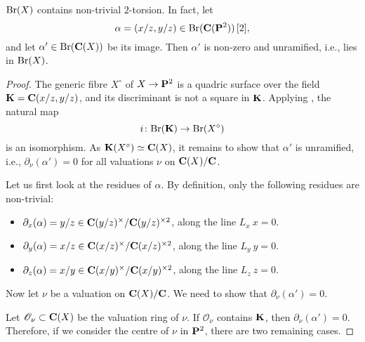 \begin{proposition}
    $\mathrm{Br} (X)$ contains non-trivial $2$-torsion. 
    In fact, let
    \[ \alpha = (x/z, y/z) \in \Br ( \bbC(\bbP^2) ) \, [2] , \]
    and let $\alpha' \in \Br (\bbC(X))$ be its image.
    Then $\alpha'$ is non-zero and unramified, i.e., lies in $\mathrm{Br} (X)$.
\end{proposition}

\begin{proof}
    The generic fibre $X^\circ$ of $X \to \bbP^2$ is a quadric surface over the field $\bbK = \bbC (x/z, y/z)$,
    and its discriminant is not a square in $\bbK$.
    Applying \cite[Proposition~6.2.3~(c)]{colliot-brauer}, the natural map 
    \[ i \: \Br (\bbK) \to \Br (X^\circ) \]
    is an isomorphism. As $\bbK (X^\circ) \simeq \bbC (X)$,
    it remains to show that $\alpha'$ is unramified, 
    i.e., $\partial_{\nu} (\alpha') = 0$ for all valuations $\nu$ on $\bbC (X) / \bbC$.

    Let us first look at the residues of $\alpha$.
    By definition, only the following residues are non-trivial:
    \begin{itemize}
        \item 
            $\partial_x (\alpha) = y/z \in \bbC (y/z)^\times / \bbC (y/z)^{\times 2}$, along the line $L_x \: x = 0$.
        \item 
            $\partial_y (\alpha) = x/z \in \bbC (x/z)^\times / \bbC (x/z)^{\times 2}$, along the line $L_y \: y = 0$.
        \item 
            $\partial_z (\alpha) = x/y \in \bbC (x/y)^\times / \bbC (x/y)^{\times 2}$, along the line $L_z \: z = 0$.
    \end{itemize}

    Now let $\nu$ be a valuation on $\bbC (X) / \bbC$.
    We need to show that $\partial_{\nu} (\alpha') = 0$.

    Let $\mathscr{O}_{\nu} \subset \bbC (X)$ be the valuation ring of $\nu$.
    If $\mathscr{O}_{\nu}$ contains $\bbK$, then $\partial_{\nu} (\alpha') = 0$.
    Therefore, if we consider the centre of $\nu$ in $\bbP^2$, there are two remaining cases.


\end{proof}
